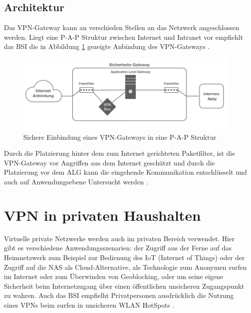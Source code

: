 \subsection{Architektur}
Das VPN-Gateway kann an verschieden Stellen an das Netzwerk angeschlossen werden. Liegt eine P-A-P Struktur zwischen Internet und Intranet vor empfiehlt das BSI die in Abbildung \ref{vpnarch} gezeigte Anbindung des VPN-Gateways \cite{isi-lana}. 

\begin{figure}[h]
	\includegraphics[width=\linewidth]{vpnarchitektur.jpeg}
	\caption{Sichere Einbindung eines VPN-Gateways in eine P-A-P Struktur}
	\label{vpnarch}
\end{figure}

Durch die Platzierung hinter dem zum Internet gerichteten Paketfilter, ist die VPN-Gateway vor Angriffen aus dem Internet geschützt und durch die Platzierung vor dem ALG kann die eingehende Kommunikation entschlüsselt und auch auf Anwendungsebene Untersucht werden \cite{bsivpnaufbau}.\\
 

\section{VPN in privaten Haushalten}

Virtuelle private Netzwerke werden auch im privaten Bereich  verwendet. Hier gibt es verschiedene Anwendungsszenarien: der Zugriff aus der Ferne auf das Heimnetzwerk zum Beispiel zur Bedienung des IoT (Internet of Things) oder der Zugriff auf die NAS als Cloud-Alternative, als Technologie zum Anonymen surfen im Internet oder zum Überwinden von Geoblocking, oder um seine eigene Sicherheit beim Internetzugang über einen öffentlichen unsicheren Zugangspunkt zu wahren. Auch das BSI empfielht  Privatpersonen ausdrücklich die Nutzung eines VPNs beim surfen in unsicheren WLAN HotSpots \cite{bsibuergervpn}.

